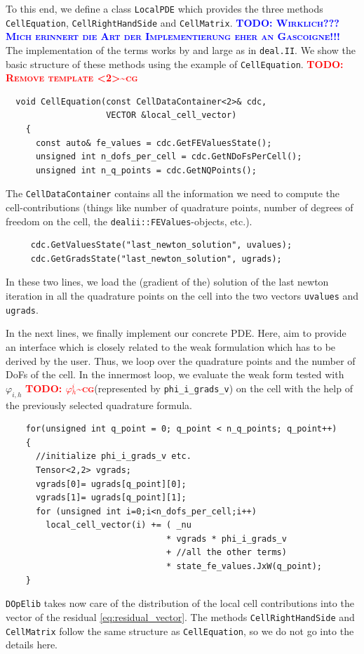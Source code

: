 \documentclass[prodmode,acmtoms]{acmsmall}
\numberwithin{equation}{section}
\renewcommand{\phi}{\varphi}
\newcommand{\deal}{\texttt{deal.II}}
\newcommand{\dope}{\texttt{DOpElib}}
\newcommand{\todo}[1]{\textbf{\textsc{\textcolor{blue}{TODO: #1}}}}
\newcommand{\todocg}[1]{\textbf{\textsc{\textcolor{red}{TODO: #1\textasciitilde cg}}}}
\begin{document}
To this end, we define a class \texttt{LocalPDE} which provides the three methods
\texttt{CellEquation}, \texttt{CellRightHandSide} and \texttt{CellMatrix}. 
\todo{Wirklich??? Mich erinnert die Art der Implementierung eher an Gascoigne!!!}
The implementation of the terms works by and large as in \deal{}. We show the basic structure of these methods using the example of \texttt{CellEquation}.
\todocg{Remove template <2>}
\begin{lstlisting}
  void CellEquation(const CellDataContainer<2>& cdc,
                    VECTOR &local_cell_vector)
    {
      const auto& fe_values = cdc.GetFEValuesState();
      unsigned int n_dofs_per_cell = cdc.GetNDoFsPerCell();
      unsigned int n_q_points = cdc.GetNQPoints();
\end{lstlisting}
 The \texttt{CellDataContainer} contains all the information we need to compute the cell-contributions (things like number of quadrature points, number of degrees of freedom on the cell, the \texttt{dealii::FEValues}-objects, etc.).
  \begin{lstlisting}
     cdc.GetValuesState("last_newton_solution", uvalues);
     cdc.GetGradsState("last_newton_solution", ugrads);
 \end{lstlisting}
 In these two lines, we load the (gradient of the) solution of the last newton iteration in all the quadrature points on the cell into the two vectors \texttt{uvalues} and \texttt{ugrads}.

In the next lines, we finally implement our concrete PDE. Here, aim to provide 
an interface which is closely related to the weak formulation which 
has to be derived by the user. Thus,
we loop over the quadrature points and the number of DoFs of the cell. In the innermost loop, we evaluate the weak form tested with $\phi_{i,h}$ \todocg{$\phi_h^i$}(represented by \texttt{phi\_i\_grads\_v}) on the cell with the help of the previously selected quadrature formula. 
 \begin{lstlisting}
    for(unsigned int q_point = 0; q_point < n_q_points; q_point++)
    {
      //initialize phi_i_grads_v etc.
      Tensor<2,2> vgrads;
      vgrads[0]= ugrads[q_point][0]; 
      vgrads[1]= ugrads[q_point][1];
      for (unsigned int i=0;i<n_dofs_per_cell;i++)
        local_cell_vector(i) += ( _nu 
                                * vgrads * phi_i_grads_v 
                                + //all the other terms)
                                * state_fe_values.JxW(q_point);
    }
\end{lstlisting}
\dope{} takes now care of the distribution of the local cell contributions into  the vector of the residual \eqref{eq:residual_vector}. The methods \texttt{CellRightHandSide} and \texttt{CellMatrix} follow the same structure as 
\texttt{CellEquation}, so we do not go into the details here.
\end{document}
